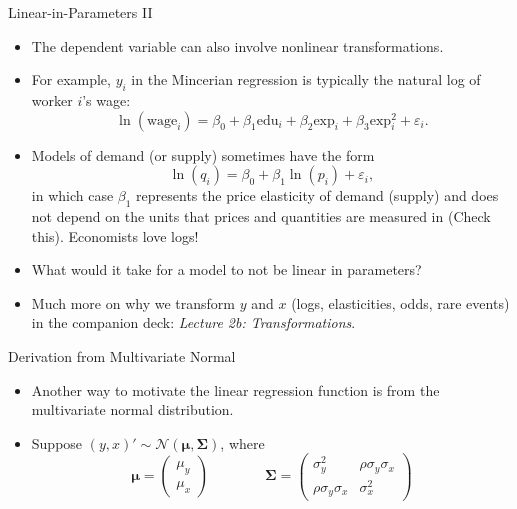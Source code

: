 \documentclass[aspectratio=169,11pt]{beamer}
\begin{document}
\begin{frame}{Linear-in-Parameters II}
\begin{itemize}
	\item The dependent variable can also involve nonlinear transformations.

	\smallskip	
	\item For example, $y_{i}$ in the Mincerian regression is typically the natural log of worker $i$'s wage:\[
\ln \left(\text{wage}_{i}\right)=\beta_{0}+\beta_{1}\text{edu}_{i}+\beta_{2}\text{exp}_{i}+\beta_{3}\text{exp}_{i}^{2}+\varepsilon_{i}.
\]

	\smallskip
	\item Models of demand (or supply) sometimes have the form\[
		\ln \left( q_{i} \right) = \beta_0 + \beta_1 \ln \left( p_{i}\right) + \varepsilon_i,
	\]
	in which case $ \beta_1$ represents the price elasticity of demand (supply) and does not depend on the units that prices
	and quantities are measured in  (Check this). Economists love logs!
	

	\smallskip
	\item What would it take for a model to not be linear in parameters?

	\smallskip
	\item Much more on \alert{why} we transform $y$ and $x$ (logs, elasticities,
	odds, rare events) in the companion deck: \emph{Lecture 2b: Transformations}.
\end{itemize}
\end{frame}

\begin{frame}{Derivation from Multivariate Normal}
\begin{itemize}
	\item Another way to motivate the linear regression function is from the multivariate normal distribution.

	\smallskip
	\item Suppose $\left(y,x\right)' \sim \mathcal{N}\left(\boldsymbol{\mu},\boldsymbol{\Sigma}\right)$, where\[
\boldsymbol{\mu}=\left(\begin{array}{c}
\mu_{y}\\
\mu_{x}
\end{array}\right)\qquad\qquad\boldsymbol{\Sigma}=\left(\begin{array}{cc}
\sigma_{y}^{2} & \rho\sigma_{y}\sigma_{x}\\
\rho\sigma_{y}\sigma_{x} & \sigma_{x}^{2}
\end{array}\right)
\]


\end{itemize}
\end{frame}
\end{document}
